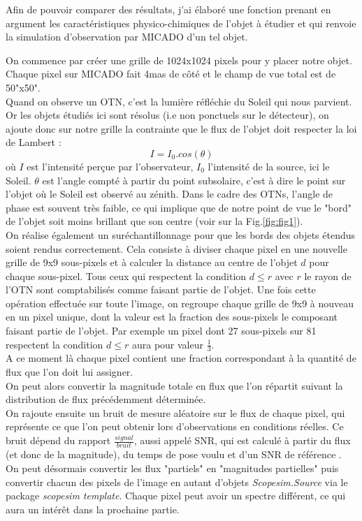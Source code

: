 \documentclass[11pt]{aa}
\begin{document}
Afin de pouvoir comparer des résultats, j'ai élaboré une fonction prenant en argument les caractéristiques physico-chimiques de l'objet à étudier et qui renvoie la simulation d'observation par MICADO d'un tel objet.

On commence par créer une grille de 1024x1024 pixels pour y placer notre objet. Chaque pixel sur MICADO fait 4mas de côté et le champ de vue total est de 50"x50". \\Quand on observe un OTN, c'est la lumière réfléchie du Soleil qui nous parvient. Or les objets étudiés ici sont résolus (i.e non ponctuels sur le détecteur), on ajoute donc sur notre grille la contrainte que le flux de l'objet doit respecter la loi de Lambert :
\begin{equation}
    I = I_0.cos(\theta)
\end{equation}
où $I$ est l'intensité perçue par l'observateur, $I_0$ l'intensité de la source, ici le Soleil. $\theta$ est l'angle compté à partir du point subsolaire, c'est à dire le point sur l'objet où le Soleil est observé au zénith. Dans le cadre des OTNs, l'angle de phase est souvent très faible, ce qui implique que de notre point de vue le "bord" de l'objet soit moins brillant que son centre (voir sur la Fig.\ref{fig:fig1}). \\
On réalise également un suréchantillonnage pour que les bords des objets étendus soient rendus correctement. Cela consiste à diviser chaque pixel en une nouvelle grille de 9x9 sous-pixels et à calculer la distance au centre de l'objet $d$ pour chaque sous-pixel. Tous ceux qui respectent la condition $d \leq r$ avec $r$ le rayon de l'OTN sont comptabilisés comme faisant partie de l'objet. Une fois cette opération effectuée sur toute l'image, on regroupe chaque grille de 9x9 à nouveau en un pixel unique, dont la valeur est la fraction des sous-pixels le composant faisant partie de l'objet. Par exemple un pixel dont 27 sous-pixels sur 81 respectent la condition $d \leq r$ aura pour valeur $\frac{1}{3}$. \\ A ce moment là chaque pixel contient une fraction correspondant à la quantité de flux que l'on doit lui assigner.  \\
 On peut alors convertir la magnitude totale en flux que l’on répartit suivant la distribution de flux précédemment déterminée.\\
On rajoute ensuite un bruit de mesure aléatoire sur le flux de chaque pixel, qui représente ce que l'on peut obtenir lors d'observations en conditions réelles. Ce bruit dépend du rapport $\frac{signal}{bruit}$, aussi appelé SNR, qui est calculé à partir du flux (et donc de la magnitude), du temps de pose voulu et d'un SNR de référence \citep{SNR}. \\On peut désormais convertir les flux "partiels" en "magnitudes partielles" puis convertir chacun des pixels de l'image en autant d'objets \textit{Scopesim.Source} via le package \textit{scopesim template}. Chaque pixel peut avoir un spectre différent, ce qui aura un intérêt dans la prochaine partie.\\
\end{document}
